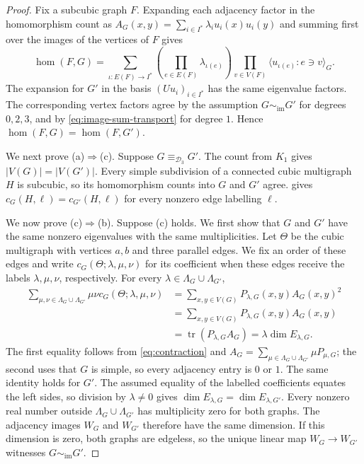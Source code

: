 \documentclass[11pt,a4paper]{article}
\theoremstyle{plain}
\theoremstyle{definition}
\DeclareMathOperator{\tr}{tr}
\begin{document}
\begin{proof}
Fix a subcubic graph $F$. Expanding each adjacency factor in the
homomorphism count as
$A_G(x,y)=\sum_{i\in I^*}\lambda_i u_i(x)u_i(y)$
and summing first over the images of the vertices of $F$ gives
\begin{equation}\label{eq:image-hom-expansion}
 \hom(F,G)=\sum_{\iota:E(F)\to I^*}
 \left(\prod_{e\in E(F)}\lambda_{\iota(e)}\right)
 \prod_{v\in V(F)}\bigl\langle u_{\iota(e)}:e\ni v\bigr\rangle_G.
\end{equation}
The expansion for $G'$ in the basis $(Uu_i)_{i\in I^*}$ has the same
eigenvalue factors. The corresponding vertex factors agree by the
assumption $G\sim_{\mathrm{im}}G'$ for degrees $0,2,3$, and by
\cref{eq:image-sum-transport} for degree $1$.
Hence $\hom(F,G)=\hom(F,G')$.

We next prove (a)$\Rightarrow$(c).
Suppose $G\equiv_{\mathcal D_3}G'$. The count from $K_1$ gives
$|V(G)|=|V(G')|$. Every simple subdivision of a connected cubic multigraph $H$ is subcubic,
so its homomorphism counts into $G$ and $G'$ agree.
 gives
$c_G(H,\ell)=c_{G'}(H,\ell)$ for every nonzero edge labelling $\ell$.

We now prove (c)$\Rightarrow$(b). Suppose (c) holds.
We first show that $G$ and $G'$ have the same nonzero eigenvalues with
the same multiplicities. Let $\Theta$ be the cubic multigraph with
vertices $a,b$ and three parallel edges. We fix an order of these edges and write
$c_G(\Theta;\lambda,\mu,\nu)$ for its coefficient when these edges
receive the labels $\lambda,\mu,\nu$, respectively.
For every $\lambda\in\Lambda_G\cup\Lambda_{G'}$,
\begin{equation}\label{eq:theta-multiplicity}
 \begin{aligned}
 \sum_{\mu,\nu\in\Lambda_G\cup\Lambda_{G'}}\mu\nu c_G(\Theta;\lambda,\mu,\nu)
 &=\sum_{x,y\in V(G)}P_{\lambda,G}(x,y)A_G(x,y)^2\\
 &=\sum_{x,y\in V(G)}P_{\lambda,G}(x,y)A_G(x,y)\\
 &=\tr(P_{\lambda,G}A_G)
 =\lambda\dim E_{\lambda,G}.
 \end{aligned}
\end{equation}
The first equality follows from \cref{eq:contraction} and
$A_G=\sum_{\mu\in\Lambda_G\cup\Lambda_{G'}}\mu P_{\mu,G}$; the second uses that $G$ is
simple, so every adjacency entry is $0$ or $1$.
The same identity holds for $G'$. The assumed equality of the labelled coefficients equates the left sides,
so division by $\lambda\ne0$ gives
$\dim E_{\lambda,G}=\dim E_{\lambda,G'}$.
Every nonzero real number outside $\Lambda_G\cup\Lambda_{G'}$ has multiplicity zero for
both graphs.
The adjacency images $W_G$ and $W_{G'}$ therefore have the same dimension.
If this dimension is zero, both graphs are edgeless, so the unique
linear map $W_G\to W_{G'}$ witnesses $G\sim_{\mathrm{im}}G'$.


\end{proof}
\end{document}
